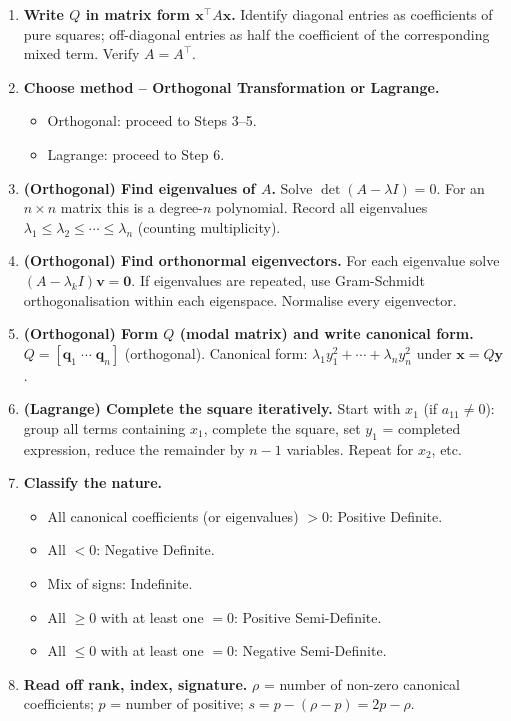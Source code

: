 \documentclass[12pt,a4paper]{article}
\begin{document}
\begin{enumerate}[label=\textbf{Step \arabic*.}, leftmargin=2.5em]
  \item \textbf{Write $Q$ in matrix form $\mathbf{x}^{\top}A\mathbf{x}$.}
    Identify diagonal entries as coefficients of pure squares; off-diagonal entries as half the coefficient of the corresponding mixed term. Verify $A = A^{\top}$.

  \item \textbf{Choose method -- Orthogonal Transformation or Lagrange.}
    \begin{itemize}[leftmargin=1.5em]
      \item Orthogonal: proceed to Steps 3--5.
      \item Lagrange: proceed to Step 6.
    \end{itemize}

  \item \textbf{(Orthogonal) Find eigenvalues of $A$.}
    Solve $\det(A - \lambda I) = 0$. For an $n\times n$ matrix this is a degree-$n$ polynomial. Record all eigenvalues $\lambda_1 \leq \lambda_2 \leq \cdots \leq \lambda_n$ (counting multiplicity).

  \item \textbf{(Orthogonal) Find orthonormal eigenvectors.}
    For each eigenvalue solve $(A-\lambda_k I)\mathbf{v} = \mathbf{0}$. If eigenvalues are repeated, use Gram-Schmidt orthogonalisation within each eigenspace. Normalise every eigenvector.

  \item \textbf{(Orthogonal) Form $Q$ (modal matrix) and write canonical form.}
    $Q = [\mathbf{q}_1 \; \cdots \; \mathbf{q}_n]$ (orthogonal). Canonical form: $\lambda_1 y_1^{2} + \cdots + \lambda_n y_n^{2}$ under $\mathbf{x} = Q\mathbf{y}$.

  \item \textbf{(Lagrange) Complete the square iteratively.}
    Start with $x_1$ (if $a_{11}\neq 0$): group all terms containing $x_1$, complete the square, set $y_1$ = completed expression, reduce the remainder by $n-1$ variables. Repeat for $x_2$, etc.

  \item \textbf{Classify the nature.}
    \begin{itemize}[leftmargin=1.5em]
      \item All canonical coefficients (or eigenvalues) $> 0$: Positive Definite.
      \item All $< 0$: Negative Definite.
      \item Mix of signs: Indefinite.
      \item All $\geq 0$ with at least one $= 0$: Positive Semi-Definite.
      \item All $\leq 0$ with at least one $= 0$: Negative Semi-Definite.
    \end{itemize}

  \item \textbf{Read off rank, index, signature.}
    $\rho$ = number of non-zero canonical coefficients; $p$ = number of positive; $s = p - (\rho - p) = 2p - \rho$.
\end{enumerate}
\end{document}
